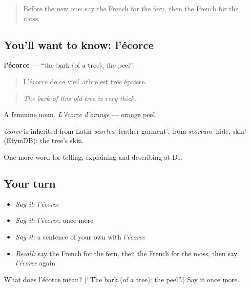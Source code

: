 \label{lesson:FR-C457-ecorce}



\begin{quote}
Before the new one: say the French for the fern, then the French for the moss.
\end{quote}

\subsection*{You'll want to know: l'écorce}
\textbf{l'écorce} — \textquotedblleft{}the bark (of a tree); the peel\textquotedblright{}.

\begin{quote}
L'écorce de ce vieil arbre est très épaisse.
\end{quote}

\begin{quote}
\emph{The bark of this old tree is very thick.}
\end{quote}

A feminine noun. \emph{L'écorce d'orange} — orange peel.

\begin{cousinweb}
\emph{écorce} is inherited from Latin \emph{scortea} 'leather garment', from \emph{scortum} 'hide, skin' (EtymDB): the tree's skin.
\end{cousinweb}

\begin{grammarlens}[title={What you've built}]
One more word for telling, explaining and describing at B1.
\end{grammarlens}

\subsection*{Your turn}
\begin{itemize}
\raggedright
  \item \emph{Say it:} \emph{l'écorce}
  \item \emph{Say it:} \emph{l'écorce}, once more
  \item \emph{Say it:} a sentence of your own with \emph{l'écorce}
  \item \emph{Recall:} say the French for the fern, then the French for the moss, then say \emph{l'écorce} again
\end{itemize}

\begin{tcolorbox}[breakable,colback=teal!4,colframe=teal!35!black,title={Before you move on}]
What does l'écorce mean? (\textquotedblleft{}The bark (of a tree); the peel\textquotedblright{}.) Say it once more.
\end{tcolorbox}
